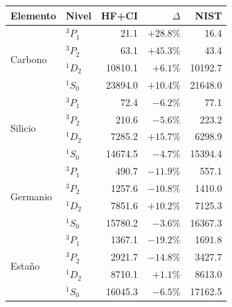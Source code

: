 \begin{tabular}{llrrr}
    \toprule
    \textbf{Elemento} & \textbf{Nivel} & \textbf{HF+CI} & $\Delta$ & \textbf{NIST} \\
    \midrule
    \multirow{4}{*}{Carbono}
     & $^3P_1$ & 21.1 & $+28.8$\% & 16.4 \\
     & $^3P_2$ & 63.1 & $+45.3$\% & 43.4 \\
     & $^1D_2$ & 10810.1 & $+6.1$\% & 10192.7 \\
     & $^1S_0$ & 23894.0 & $+10.4$\% & 21648.0 \\
    \midrule
    \multirow{4}{*}{Silicio}
     & $^3P_1$ & 72.4 & $-6.2$\% & 77.1 \\
     & $^3P_2$ & 210.6 & $-5.6$\% & 223.2 \\
     & $^1D_2$ & 7285.2 & $+15.7$\% & 6298.9 \\
     & $^1S_0$ & 14674.5 & $-4.7$\% & 15394.4 \\
    \midrule
    \multirow{4}{*}{Germanio}
     & $^3P_1$ & 490.7 & $-11.9$\% & 557.1 \\
     & $^3P_2$ & 1257.6 & $-10.8$\% & 1410.0 \\
     & $^1D_2$ & 7851.6 & $+10.2$\% & 7125.3 \\
     & $^1S_0$ & 15780.2 & $-3.6$\% & 16367.3 \\
    \midrule
    \multirow{4}{*}{Estaño}
     & $^3P_1$ & 1367.1 & $-19.2$\% & 1691.8 \\
     & $^3P_2$ & 2921.7 & $-14.8$\% & 3427.7 \\
     & $^1D_2$ & 8710.1 & $+1.1$\% & 8613.0 \\
     & $^1S_0$ & 16045.3 & $-6.5$\% & 17162.5 \\
    \bottomrule
\end{tabular}

